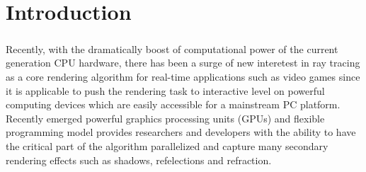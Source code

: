 \chapter{Introduction}

\paragraph{}

Recently, with the dramatically boost of computational power of the current generation CPU hardware, there has been a surge of new interetest in ray tracing as a core rendering algorithm for real-time applications such as video games since it is applicable to push the rendering task to interactive level on powerful computing devices which are easily accessible for a mainstream PC platform. Recently emerged powerful graphics processing units (GPUs) and flexible programming model provides researchers and developers with the ability to have the critical part of the algorithm parallelized and capture many secondary rendering effects such as shadows, refelections and refraction.

\paragraph{}

